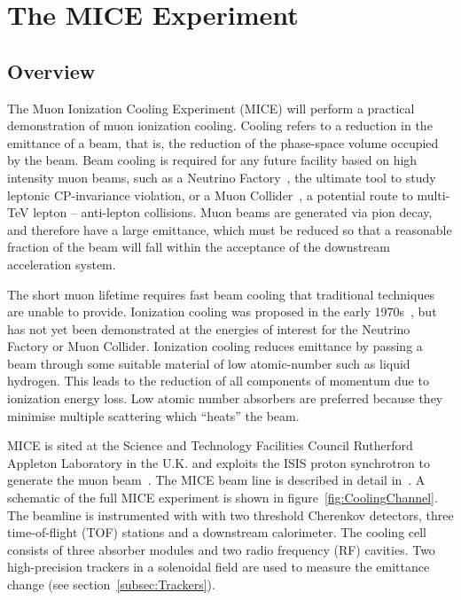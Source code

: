 \section{The MICE Experiment}
\label{sec:MICE}
  \subsection{Overview}
  \label{subsec:Overview}
  The Muon Ionization Cooling Experiment (MICE) will perform a practical demonstration of muon ionization cooling. Cooling refers to a reduction in the emittance of a beam, that is, the reduction of the phase-space volume occupied by the beam. Beam cooling is required for any future facility based on high intensity muon beams, such as a Neutrino Factory~\cite{ISS-Physics}, the ultimate tool to study leptonic CP-invariance violation, or a Muon Collider~\cite{MC_Overview}, a potential route to multi-TeV lepton -- anti-lepton collisions. Muon beams are generated via pion decay, and therefore have a large emittance, which must be reduced so that a reasonable fraction of the beam will fall within the acceptance of the downstream acceleration system.

  The short muon lifetime requires fast beam cooling that traditional techniques are unable to provide.  Ionization cooling was proposed in the early 1970s~\cite{Skrinsky, Neuffer}, but has not yet been demonstrated at the energies of interest for the Neutrino Factory or Muon Collider.  Ionization cooling reduces emittance by passing a beam through some suitable material of low atomic-number such as liquid hydrogen.  This leads to the reduction of all components of momentum due to ionization energy loss. Low atomic number absorbers are preferred because they minimise multiple scattering which ``heats'' the beam. %

  MICE is sited at the Science and Technology Facilities Council Rutherford Appleton Laboratory in the U.K. and exploits the ISIS proton synchrotron to generate the muon beam~\cite{MiceTarget}.  The MICE beam line is described in detail in~\cite{BeamlineJINST}. A schematic of the full MICE experiment is shown in figure~\ref{fig:CoolingChannel}. The beamline is instrumented with with two threshold Cherenkov detectors, three time-of-flight (TOF) stations and a downstream calorimeter. The cooling cell consists of three absorber modules and two radio frequency (RF) cavities. Two high-precision trackers in a solenoidal field are used to measure the emittance change (see section~\ref{subsec:Trackers}).
  
